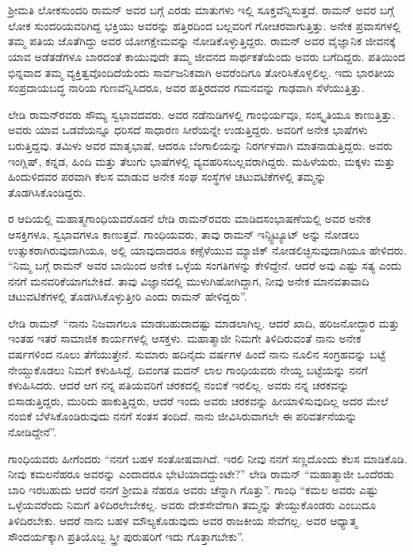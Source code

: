 
\chapter{}


ಶ‍್ರೀಮತಿ ಲೋಕಸುಂದರಿ ರಾಮನ್ ಅವರ ಬಗ್ಗೆ ಎರಡು ಮಾತುಗಳು ಇಲ್ಲಿ ಸೂಕ್ತವೆನ್ನಿಸುತ್ತದೆ. ರಾಮನ್ ಅವರ ಬಗ್ಗೆ ಲೋಕ ಸುಂದರಿಯವರಿಗಿದ್ದ ಭಕ್ತಿಯು ಅವರನ್ನು ಹತ್ತಿರದಿಂದ ಬಲ್ಲವರಿಗೆ ಗೋಚರವಾಗುತ್ತಿತ್ತು. ಅನೇಕ ಪ್ರವಾಸಗಳಲ್ಲಿ ತಮ್ಮ ಪತಿಯ ಜೊತೆಗಿದ್ದು ಅವರ ಯೋಗಕ್ಷೇಮವನ್ನು ನೋಡಿಕೊಳ್ಳುತ್ತಿದ್ದರು. ರಾಮನ್ ಅವರ ವೈಜ್ಞಾನಿಕ ಜೀವನಕ್ಕೆ ಯಾವ ಅಡೆತಡೆಗಳೂ ಬಾರದಂತೆ ಕಾಯುವುದೇ ತಮ್ಮ ಜೀವನದ ಸಾರ್ಥಕತೆಯೆಂದು ಅವರು ಬಗೆದಿದ್ದರು. ಪತಿಯಿಂದ ಭಿನ್ನವಾದ ತಮ್ಮ ವ್ಯಕ್ತಿತ್ವವೊಂದಿದೆಯೆಂದು ಸಾರ್ವಜನಿಕವಾಗಿ ಅವರೆಂದಿಗೂ ತೋರಿಸಿಕೊಳ್ಳಲಿಲ್ಲ. ಇದು ಭಾರತೀಯ ಸಂಪ್ರದಾಯಬದ್ಧ ನಾರಿಯ ಗುಣವೆನ್ನಿಸಿದರೂ, ಅವರ ಹತ್ತಿರದವರ ಗಮನವನ್ನು ಗಾಢವಾಗಿ ಸೆಳೆಯುತ್ತಿತ್ತು.

ಲೇಡಿ ರಾಮನ್‍ರವರು ಸೌಮ್ಯ ಸ್ವಭಾವದವರು. ಅವರ ನಡೆನುಡಿಗಳಲ್ಲಿ ಗಾಂಭಿರ್ಯವೂ, ಸಂಸ್ಕೃತಿಯೂ ಕಾಣುತ್ತಿತ್ತು. ಅವರು ಯಾವ ಒಡವೆಯನ್ನೂ ಧರಿಸದೆ ಸಾಧಾರಣ ಸೀರೆಯನ್ನೇ ಉಡುತ್ತಿದ್ದರು. ಅವರಿಗೆ ಅನೇಕ ಭಾಷೆಗಳು ಬರುತ್ತಿದ್ದವು. ತಮಿಳು ಅವರ ಮಾತೃಭಾಷೆ, ಆದರೂ ಬೆಂಗಾಲಿಯನ್ನು ನಿರರ್ಗಳವಾಗಿ ಮಾತನಾಡುತ್ತಿದ್ದರು. ಅವರು ಇಂಗ್ಲಿಷ್, ಕನ್ನಡ, ಹಿಂದಿ ಮತ್ತು ತೆಲುಗು ಭಾಷೆಗಳಲ್ಲಿ ವ್ಯವಹರಿಸಬಲ್ಲವರಾಗಿದ್ದರು. ಮಹಿಳೆಯರು, ಮಕ್ಕಳು ಮತ್ತು ಹಿಂದುಳಿದವರ ಪರವಾಗಿ ಕೆಲಸ ಮಾಡುವ ಅನೇಕ ಸಂಘ ಸಂಸ್ಥೆಗಳ ಚಟುವಟಿಕೆಗಳಲ್ಲಿ ತಮ್ಮನ್ನು ತೊಡಗಿಸಿಕೊಂಡಿದ್ದರು.

ರ ಆದಿಯಲ್ಲಿ ಮಹಾತ್ಮಗಾಂಧಿಯವರೊಡನೆ ಲೇಡಿ ರಾಮನ್‍ರವರು ಮಾಡಿದ\break ಸಂಭಾಷಣೆಯಲ್ಲಿ ಅವರ ಅನೇಕ ಆಸಕ್ತಿಗಳೂ, ಸ್ವಭಾವಗಳೂ ಕಾಣುತ್ತವೆ. ಗಾಂಧಿಯವರು, ತಾವು ರಾಮನ್ ಇನ್ಸ್ಟಿಟ್ಯೂಟ್ ಅನ್ನು ನೋಡಲು ಉತ್ಸುಕರಾಗಿರುವುದಾಗಿಯೂ, ಅಲ್ಲಿ ಯಾವುದಾದರೂ ಕಣ್ಸೆಳೆಯುವ ಮ್ಯಾಜಿಕ್ ನೋಡಲಿಚ್ಛಿಸುವುದಾಗಿಯೂ ಹೇಳಿದರು. “ನಿಮ್ಮ ಬಗ್ಗೆ ರಾಮನ್ ಅವರ ಬಾಯಿಂದ ಅನೇಕ ಒಳ್ಳೆಯ ಸಂಗತಿಗಳನ್ನು ಕೇಳಿದ್ದೇನೆ. ಆದರೆ ಅವು ಎಷ್ಟು ಸತ್ಯ ಎಂದು ನನಗೆ ಮನವರಿಕೆಯಾಗಬೇಕಿದೆ. ತಾವು ವಿಜ್ಞಾನದಲ್ಲಿ ಮುಳುಗಿಹೋಗಿದ್ದಾಗ, ನೀವು ಅನೇಕ ಮಾನವತಾವಾದಿ ಚಟುವಟಿಕೆಗಳಲ್ಲಿ ತೊಡಗಿಸಿಕೊಳ್ಳುತ್ತೀರಿ ಎಂದು ರಾಮನ್ ಹೇಳಿದ್ದರು”.

ಲೇಡಿ ರಾಮನ್ \enginline{-} “ನಾನು ನಿಜವಾಗಲೂ ಮಾಡಬಹುದಾದಷ್ಟು ಮಾಡಲಾಗಿಲ್ಲ. ಆದರೆ ಖಾದಿ, ಹರಿಜನೋದ್ಧಾರ ಮತ್ತು ಇಂತಹ ಇತರೆ ಸಾಮಾಜಿಕ ಕಾರ್ಯಗಳಲ್ಲಿ ಆಸಕ್ತಳು. ಮಹಾತ್ಮಾಜೀ ನಿಮಗೇ ತಿಳಿದಿರುವಂತೆ ನಾನು ಅನೇಕ ವರ್ಷಗಳಿಂದ ನೂಲು ತೆಗೆಯುತ್ತೇನೆ. ಸುಮಾರು ಹದಿನೈದು ವರ್ಷಗಳ ಹಿಂದೆ ನಾನು ನೂಲಿನ ಸಂಗ್ರಹವನ್ನು ಬಟ್ಟೆ ನೇಯ್ದುಕೊಡಲು ನಿಮಗೆ ಕಳುಹಿಸಿದ್ದೆ. ದಿವಂಗತ ಮದನ್ ಲಾಲ ಗಾಂಧಿಯವರು ನೇಯ್ದ ಬಟ್ಟೆಯನ್ನು ನನಗೆ ಕಳುಹಿಸಿದರು. ಆದರೆ ಆಗ ನನ್ನ ಪತಿಯವರಿಗೆ ಚರಕದಲ್ಲಿ ನಂಬಿಕೆ ಇರಲಿಲ್ಲ. ಅವರು ನನ್ನ ಚರಕವನ್ನು ಬಿಸಾಡುತ್ತಿದ್ದರು, ಮುರಿದು ಹಾಕುತ್ತಿದ್ದರು, ಆದರೆ ಇಂದು ಅವರು ಚರಕವನ್ನು ಹೀಯಾಳಿಸುವುದಿಲ್ಲ ಅದರ ಮೇಲೆ ನಂಬಿಕೆ ಬೆಳೆಸಿಕೊಂಡಿರುವುದು ನನಗೆ ಸಂತಸ ತಂದಿದೆ. ನಾನು ಜೀವಿಸಿರುವಾಗಲೇ ಈ ಪರಿವರ್ತನೆಯನ್ನು ನೋಡಿದ್ದೇನೆ”.

ಗಾಂಧಿಯವರು ಹೀಗೆಂದರು “ನನಗೆ ಬಹಳ ಸಂತೋಷವಾಗಿದೆ. ಇರಲಿ ನೀವು ನನಗೆ ಸಣ್ಣದೊಂದು ಕೆಲಸ ಮಾಡಿಕೊಡಿ. ನೀವು ಕಮಲನೆಹರೂ ಅವರನ್ನು ಎಂದಾದರೂ ಭೇಟಿಯಾದ\-ದ್ದುಂಟೇ?” ಲೇಡಿ ರಾಮನ್\enginline{-} “ಮಹಾತ್ಮಾಜೀ ಒಂದೆರಡು ಬಾರಿ ಇರಬಹುದು ಆದರೆ ನನಗೆ ಶ‍್ರೀಮತಿ ನೆಹರೂ ಅವರು ಚೆನ್ನಾಗಿ ಗೊತ್ತು”. ಗಾಂಧಿ \enginline{-} “ಕಮಲ ಅವರು ಎಷ್ಟು ಒಳ್ಳೆಯವರೆಂದು ನಿಮಗೆ ತಿಳಿದಿರಲೇಬೇಕಲ್ಲ. ಅವರು ದೇಶಸೇವೆಗಾಗಿ ತಮ್ಮನ್ನು ತೇಯ್ದುಕೊಂಡರು ಎಂಬುದೂ ತಿಳಿದಿರಬೇಕು. ಆದರೆ ನಾನು ಬಹಳ ಮೌಲ್ಯಕೊಡುವುದು ಅವರ ರಾಜಕೀಯ ಸೇವೆಗಲ್ಲ. ಅವರ ಆಧ್ಯಾತ್ಮ ಸೌಂದರ್ಯಕ್ಕಾಗಿ ಪ್ರತಿಯೊಬ್ಬ ಸ್ತ್ರೀ ಪುರುಷರಿಗೆ ಇದು ಗೊತ್ತಾಗಬೇಕು”.

